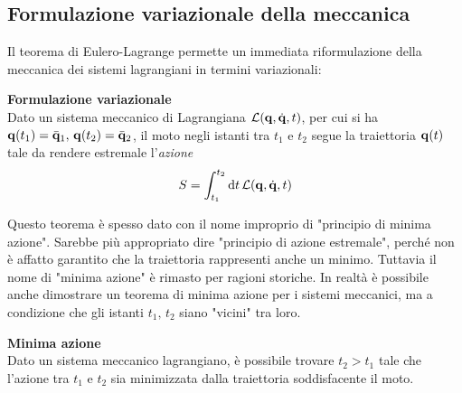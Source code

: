     \subsection{Formulazione variazionale della meccanica}
    Il teorema di Eulero-Lagrange permette un immediata riformulazione della meccanica dei sistemi lagrangiani in termini variazionali:
    \begin{theorem}
        \textbf{Formulazione variazionale}\\
        Dato un sistema meccanico di Lagrangiana $\mathcal{L}(\mathbf{q},\dot{\mathbf{q}},t)$, per cui si ha $\mathbf{q}(t_1)=\bar{\mathbf{q}}_1,\,\mathbf{q}(t_2) = \bar{\mathbf{q}}_2$, il moto negli istanti tra $t_1$ e $t_2$ segue la traiettoria $\mathbf{q}(t)$ tale da rendere estremale l'\emph{azione}
        \begin{equation}
            S = \int_{t_1}^{t_2}\mathrm{d} t\,\mathcal{L}(\mathbf{q},\dot{\mathbf{q}},t)
        \end{equation}
    \end{theorem}
    Questo teorema è spesso dato con il nome improprio di "principio di minima azione". Sarebbe più appropriato dire "principio di azione estremale", perché non è affatto garantito che la traiettoria rappresenti anche un minimo. Tuttavia il nome di "minima azione" è rimasto per ragioni storiche. In realtà è possibile anche dimostrare un teorema di minima azione per i sistemi meccanici, ma a condizione che gli istanti $t_1,\,t_2$ siano "vicini" tra loro.
    \begin{theorem}
        \textbf{Minima azione}\\
        Dato un sistema meccanico lagrangiano, è possibile trovare $t_2>t_1$ tale che l'azione tra $t_1$ e $t_2$ sia minimizzata dalla traiettoria soddisfacente il moto.
    \end{theorem}
